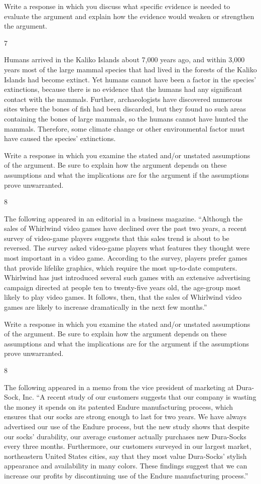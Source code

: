 \documentclass[]{article}
\begin{document}
Write a response in which you discuss what specific evidence is needed
to evaluate the argument and explain how the evidence would weaken or
strengthen the argument.

7

Humans arrived in the Kaliko Islands about 7,000 years ago, and within
3,000 years most of the large mammal species that had lived in the
forests of the Kaliko Islands had become extinct. Yet humans cannot have
been a factor in the species' extinctions, because there is no evidence
that the humans had any significant contact with the mammals. Further,
archaeologists have discovered numerous sites where the bones of fish
had been discarded, but they found no such areas containing the bones of
large mammals, so the humans cannot have hunted the mammals. Therefore,
some climate change or other environmental factor must have caused the
species' extinctions.

Write a response in which you examine the stated and/or unstated
assumptions of the argument. Be sure to explain how the argument depends
on these assumptions and what the implications are for the argument if
the assumptions prove unwarranted.

8

The following appeared in an editorial in a business magazine.
``Although the sales of Whirlwind video games have declined over the
past two years, a recent survey of video-game players suggests that this
sales trend is about to be reversed. The survey asked video-game players
what features they thought were most important in a video game.
According to the survey, players prefer games that provide lifelike
graphics, which require the most up-to-date computers. Whirlwind has
just introduced several such games with an extensive advertising
campaign directed at people ten to twenty-five years old, the age-group
most likely to play video games. It follows, then, that the sales of
Whirlwind video games are likely to increase dramatically in the next
few months.''

Write a response in which you examine the stated and/or unstated
assumptions of the argument. Be sure to explain how the argument depends
on these assumptions and what the implications are for the argument if
the assumptions prove unwarranted.

8

The following appeared in a memo from the vice president of marketing at
Dura-Sock, Inc. ``A recent study of our customers suggests that our
company is wasting the money it spends on its patented Endure
manufacturing process, which ensures that our socks are strong enough to
last for two years. We have always advertised our use of the Endure
process, but the new study shows that despite our socks' durability, our
average customer actually purchases new Dura-Socks every three months.
Furthermore, our customers surveyed in our largest market, northeastern
United States cities, say that they most value Dura-Socks' stylish
appearance and availability in many colors. These findings suggest that
we can increase our profits by discontinuing use of the Endure
manufacturing process.''
\end{document}
